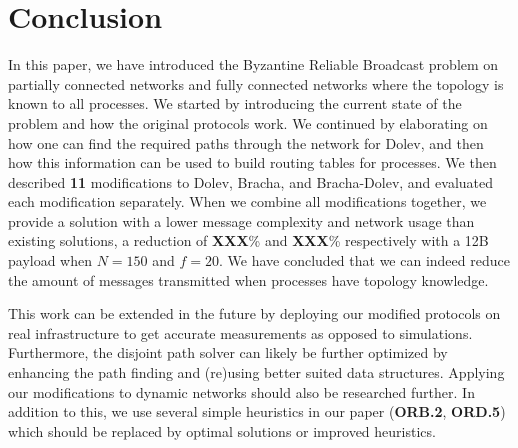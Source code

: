 \section{Conclusion}
\label{conclusion}


In this paper, we have introduced the Byzantine Reliable Broadcast problem on partially connected networks and fully connected networks where the topology is known to all processes. We started by introducing the current state of the problem and how the original protocols work. We continued by elaborating on how one can find the required paths through the network for Dolev, and then how this information can be used to build routing tables for processes. We then described \textbf{11} modifications to Dolev, Bracha, and Bracha-Dolev, and evaluated each modification separately. When we combine all modifications together, we provide a solution with a lower message complexity and network usage than existing solutions, a reduction of \textbf{XXX}\% and \textbf{XXX}\% respectively with a 12B payload when $N=150$ and $f=20$.
We have concluded that we can indeed reduce the amount of messages transmitted when processes have topology knowledge.

This work can be extended in the future by deploying our modified protocols on real infrastructure to get accurate measurements as opposed to simulations. Furthermore, the disjoint path solver can likely be further optimized by enhancing the path finding and (re)using better suited data structures. Applying our modifications to dynamic networks should also be researched further. In addition to this, we use several simple heuristics in our paper (\textbf{ORB.2}, \textbf{ORD.5}) which should be replaced by optimal solutions or improved heuristics.

